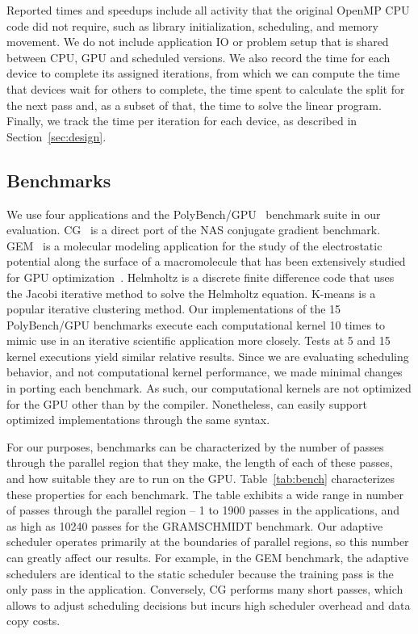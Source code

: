 Reported times and speedups include all activity that the original OpenMP CPU
code did not require, such as library initialization, scheduling, and memory
movement. We do not include application IO or problem setup that is shared
between CPU, GPU and scheduled versions. We also record the time for each
device to complete its assigned iterations, from which we can compute the time
that devices wait for others to complete, the time spent to calculate the
split for the next pass and, as a subset of that, the time to solve the linear
program. Finally, we track the time per iteration for each device, as
described in Section~\ref{sec:design}.

\subsection{Benchmarks}

We use four applications and the PolyBench/GPU~\cite{GrauerGray:ur} benchmark
suite in our evaluation. CG~\cite{Bailey:1991kk} is a direct port of the NAS
conjugate gradient benchmark.  GEM~\cite{Anandakrishnan:2010gk} is
a molecular modeling application for the study of the electrostatic potential
along the surface of a macromolecule that has been extensively studied for GPU
optimization~\cite{daga-icpads11-archopt}.  Helmholtz is a discrete finite
difference code that uses the Jacobi iterative method to solve the Helmholtz
equation. K-means is a popular iterative clustering method.  Our
implementations of the 15 PolyBench/GPU benchmarks execute each computational
kernel 10 times to mimic use in an iterative scientific application more
closely. Tests at 5 and 15 kernel executions yield similar relative results.
Since we are evaluating scheduling behavior, and not computational kernel
performance, we made minimal changes in porting each benchmark. As such, our
computational kernels are not optimized for the GPU other than by the
compiler. Nonetheless, \tsar can easily support optimized implementations
through the same syntax.

For our purposes, benchmarks can be characterized by the number of passes
through the parallel region that they make, the length of each of these
passes, and how suitable they are to run on the GPU.  Table~\ref{tab:bench}
characterizes these properties for each benchmark.  The table exhibits a wide
range in number of passes through the parallel region --  1 to 1900 passes in
the applications, and as high as 10240 passes for the GRAMSCHMIDT benchmark.
Our adaptive scheduler operates primarily at the boundaries of parallel
regions, so this number can greatly affect our results. For example, in the
GEM  benchmark, the adaptive schedulers are identical to the static scheduler
because the training pass is the only pass in the application. Conversely, CG
performs many short passes, which allows \tsar to adjust scheduling decisions
but incurs high scheduler overhead and data copy costs.

